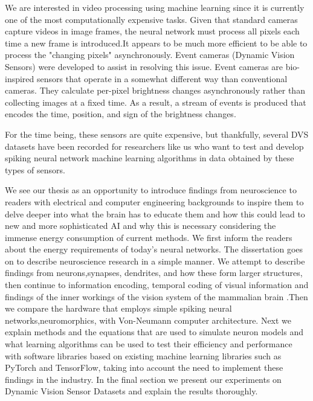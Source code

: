 \documentclass[12pt]{report}
\begin{document}
We are interested in video processing using machine learning since it is currently one of the most computationally expensive tasks. Given that standard cameras capture videos in image frames, the neural network must process all pixels each time a new frame is introduced.It appears to be much more efficient to be able to process the "changing pixels" asynchronously. Event cameras (Dynamic Vision Sensors) were developed to assist in resolving this issue. Event cameras are bio-inspired sensors that operate in a somewhat different way than conventional cameras. They calculate per-pixel brightness changes asynchronously rather than collecting images at a fixed time. As a result, a stream of events is produced that encodes the time, position, and sign of the brightness changes.

For the time being, these sensors are quite expensive, but thankfully, several DVS datasets have been recorded for researchers like us who want to test and develop spiking neural network machine learning algorithms in data obtained by these types of sensors.

We see our thesis as an opportunity to introduce findings from neuroscience to readers with electrical and computer engineering backgrounds to inspire them to delve deeper into what the brain has to educate them and how this could lead to new and more sophisticated AI and why this is necessary considering the immense energy consumption of current methods. We first inform the readers about the energy requirements of today's neural networks. The dissertation goes on to describe neuroscience research in a simple manner. We attempt to describe findings from neurons,synapses, dendrites, and how these form larger structures, then continue to information encoding, temporal coding of visual information and findings of the inner workings of the vision system of the mammalian brain .Then we compare the hardware that employs simple spiking neural networks,neuromorphics, with Von-Neumann computer architecture. Next we explain methods and the equations that are used to simulate neuron models and what learning algorithms can be used to test their efficiency and performance with software libraries based on existing machine learning libraries such as PyTorch and TensorFlow, taking into account the need to implement these findings in the industry. In the final section we present our experiments on Dynamic Vision Sensor Datasets and explain the results thoroughly.
\end{document}
